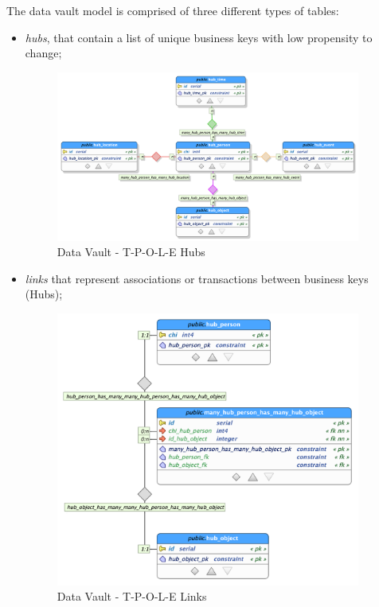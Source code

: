 The data vault model is comprised of three different types of tables:


\begin{itemize}
\item \emph{hubs}, that contain a list of unique business keys with low propensity to change;

\begin{figure}[H]
    \centering
    \includegraphics[width=10cm]{figures/technical/tpole_hubs.png}
    \caption{Data Vault - T-P-O-L-E Hubs}
    \label{fig:dvhubs}
\end{figure}

\item \emph{links} that represent associations or transactions between business keys (Hubs);

\begin{figure}[H]
    \centering
    \includegraphics[width=10cm]{figures/technical/links.png}
    \caption{Data Vault - T-P-O-L-E Links}
    \label{fig:dvlinks}
\end{figure}


\end{itemize}
